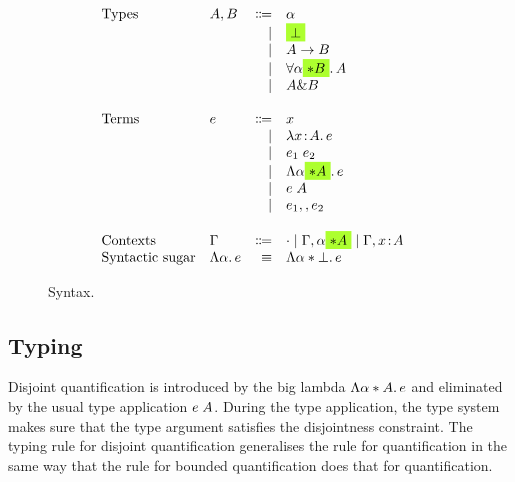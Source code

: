 \begin{figure}
  \[
    \begin{array}{l}
      \begin{array}{llrll}
        \text{Types}
        & A, B & \Coloneqq & \alpha                  & \\
        &      & \mid & \highlight {$\bot$}          & \\
        &      & \mid & A \to B                      & \\
        &      & \mid & \for {\alpha \highlight {$\disjoint B$}} A  & \\
        &      & \mid & A \inter B                   & \\

        \\
        \text{Terms}
        & e & \Coloneqq & x                        & \\
        &   & \mid & \lam x A e                    & \\
        &   & \mid & \app {e_1} {e_2}              & \\
        &   & \mid & \blam {\alpha \highlight {$\disjoint A$}} e  & \\
        &   & \mid & \tapp e A                     & \\
        &   & \mid & e_1 \mergeop e_2              & \\

        \\
        \text{Contexts}
        & \Gamma & \Coloneqq & \cdot
                   \mid \Gamma, \alpha \highlight {$\disjoint A$}
                   \mid \Gamma, x \hast A  & \\

        \text{Syntactic sugar} & \blam {\alpha} e & \equiv & \blam {\alpha \disjoint \bot} e & \\
      \end{array}
    \end{array}
  \]

  \label{fig:fi-syntax}
  \caption{Syntax.}
\end{figure}

\subsection{Typing}


Disjoint quantification is introduced by the big lambda $\Lambda \alpha *
A.\, e$ and eliminated by the usual type application $e \; A$. During the type
application, the type system makes sure that the type argument satisfies the
disjointness constraint. The typing rule for disjoint quantification generalises
the rule for quantification in the same way that the rule for bounded
quantification does that for quantification.

